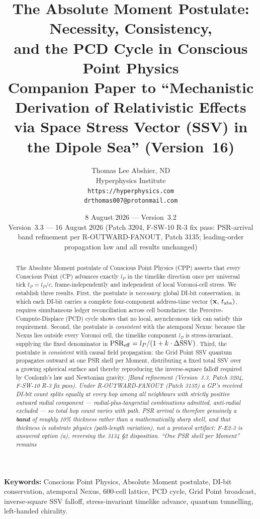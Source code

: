 \documentclass[12pt]{article}
\title{\textbf{The Absolute Moment Postulate: Necessity, Consistency,\\
and the PCD Cycle in Conscious Point Physics}\\[6pt]
{\large Companion Paper to ``Mechanistic Derivation of Relativistic Effects\\
via Space Stress Vector (SSV) in the Dipole Sea'' (Version~16)}}
\author{Thomas Lee Abshier, ND\\
Hyperphysics Institute\\
\texttt{https://hyperphysics.com}\\
\texttt{drthomas007@protonmail.com}}
\date{8 August 2026 --- Version~3.2\\[2pt]
{\small Version~3.3 --- 16 August 2026 (Patch 3204, F-SW-10 R-3 fix pass:
PSR-arrival band refinement per R-OUTWARD-FANOUT, Patch 3135; leading-order
propagation law and all results unchanged)}}
\begin{document}
\maketitle

\noindent\textbf{Keywords:} Conscious Point Physics, Absolute Moment postulate,
DI-bit conservation, atemporal Nexus, 600-cell lattice, PCD cycle,
Grid Point broadcast, inverse-square SSV falloff, stress-invariant timelike
advance, quantum tunnelling, left-handed chirality.

\begin{abstract}
The Absolute Moment postulate of Conscious Point Physics (CPP) asserts that
every Conscious Point (CP) advances exactly $l_P$ in the timelike direction
once per universal tick $t_P = l_P/c$, frame-independently and independent of
local Voronoi-cell stress.  We establish three results.  First, the postulate
is \emph{necessary}: global DI-bit conservation, in which each DI-bit carries a
complete four-component address-time vector
$(\mathbf{x},\, t_{\rm abs})$, requires simultaneous ledger reconciliation
across cell boundaries; the Perceive-Compute-Displace (PCD) cycle shows that
no local, asynchronous tick can satisfy this requirement.  Second, the postulate
is \emph{consistent} with the atemporal Nexus: because the Nexus lies outside
every Voronoi cell, the timelike component $l_P$ is stress-invariant, supplying
the fixed denominator in $\text{PSR}_{\rm eff} = l_P/(1+k\cdot\Delta\text{SSV})$.
Third, the postulate is \emph{consistent} with causal field propagation: the
Grid Point SSV quantum propagates outward at one PSR shell per Moment,
distributing a fixed total SSV over a growing spherical surface and thereby
reproducing the inverse-square falloff required by Coulomb's law and
Newtonian gravity.  \emph{[Band refinement (Version~3.3, Patch 3204, F-SW-10
R-3 fix pass).  Under R-OUTWARD-FANOUT (Patch 3135) a GP's received DI-bit
count splits equally at every hop among all neighbours with strictly positive
outward radial component --- radial-plus-tangential combinations admitted,
anti-radial excluded --- so total hop count varies with path.  PSR arrival is
therefore genuinely a \textbf{band} of roughly 10\% thickness rather than a
mathematically sharp shell, and that thickness is substrate physics
(path-length variation), not a protocol artifact: F-E2-3 is answered option
(a), reversing the 3134 \S2 disposition.  ``One PSR shell per Moment'' remains
}
\end{abstract}
\end{document}
